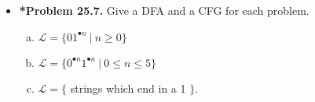 \documentclass[11pt]{article}
\begin{document}
\begin{itemize}
\vspace{0.2in}

\item \textbf{*Problem 25.7.}
Give a DFA and a CFG for each problem.
\begin{enumerate}[(a)]
\item $\mathcal{L}=\{01^{\bullet n}\ |\ n\ge 0\}$
\item $\mathcal{L}=\{0^{\bullet n}1^{\bullet n}\ |\ 0\le n\le 5\}$
\item $\mathcal{L}=\{$ strings which end in a 1 $\}$.
\end{enumerate}

\end{itemize}
\end{document}
